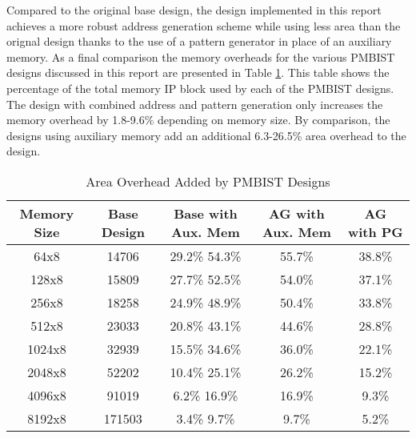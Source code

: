 Compared to the original base design, the design implemented in this report achieves a more robust address generation scheme while using less area than the orignal design thanks to the use of a pattern generator in place of an auxiliary memory.  As a final comparison the memory overheads for the various PMBIST designs discussed in this report are presented in Table \ref{tab:all_overhead}.  This table shows the percentage of the total memory IP block used by each of the PMBIST designs.  The design with combined address and pattern generation only increases the memory overhead by 1.8-9.6\% depending on memory size.  By comparison, the designs using auxiliary memory add an additional 6.3-26.5\% area overhead to the design.  

\begin{table}[h]
\caption{Area Overhead Added by PMBIST Designs}
\centering
\begin{tabular}{|c| c| c| c| c|}
\hline
Memory Size & Base Design & Base with Aux. Mem & AG with Aux. Mem & AG with PG  \\
\hline\hline
64x8   & 14706  & 29.2\% 54.3\% & 55.7\% & 38.8\% \\
128x8  & 15809  & 27.7\% 52.5\% & 54.0\% & 37.1\% \\
256x8  & 18258  & 24.9\% 48.9\% & 50.4\% & 33.8\% \\
512x8  & 23033  & 20.8\% 43.1\% & 44.6\% & 28.8\% \\
1024x8 & 32939  & 15.5\% 34.6\% & 36.0\% & 22.1\% \\
2048x8 & 52202  & 10.4\% 25.1\% & 26.2\% & 15.2\% \\
4096x8 & 91019  &  6.2\% 16.9\% & 16.9\% &  9.3\% \\
8192x8 & 171503 &  3.4\%  9.7\% &  9.7\% &  5.2\% \\ [0.5ex]
\hline
\end{tabular}
\label{tab:all_overhead}
\end{table}





